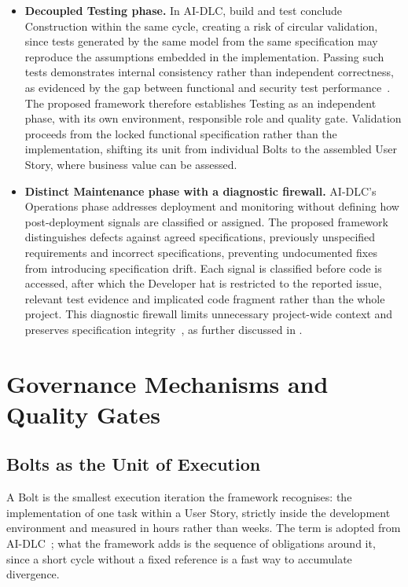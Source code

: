 \begin{itemize}[leftmargin=0.6cm, itemsep=0.5em]

\item \textbf{Decoupled Testing phase.} In \ac{AI-DLC}, build and test conclude Construction within the same cycle, creating a risk of circular validation, since tests generated by the same model from the same specification may reproduce the assumptions embedded in the implementation. Passing such tests demonstrates internal consistency rather than independent correctness, as evidenced by the gap between functional and security test performance~\cite{Zhao:2025vibe, Veracode:2025gen}. The proposed framework therefore establishes Testing as an independent phase, with its own environment, responsible role and quality gate. Validation proceeds from the locked functional specification rather than the implementation, shifting its unit from individual Bolts to the assembled User Story, where business value can be assessed.

\item \textbf{Distinct Maintenance phase with a diagnostic firewall.} \ac{AI-DLC}'s Operations phase addresses deployment and monitoring without defining how post-deployment signals are classified or assigned. The proposed framework distinguishes defects against agreed specifications, previously unspecified requirements and incorrect specifications, preventing undocumented fixes from introducing specification drift. Each signal is classified before code is accessed, after which the Developer hat is restricted to the reported issue, relevant test evidence and implicated code fragment rather than the whole project. This diagnostic firewall limits unnecessary project-wide context and preserves specification integrity~\cite{Zhao:2025vibe}, as further discussed in .

\end{itemize}

\section{Governance Mechanisms and Quality Gates}
\label{sec:governance}


\subsection{Bolts as the Unit of Execution}
\label{sec:bolts}
A Bolt is the smallest execution iteration the framework recognises: the implementation of one task within a User Story, strictly inside the development environment and measured in hours rather than weeks. The term is adopted from \ac{AI-DLC}~\cite{AWS:2025aidlc}; what the framework adds is the sequence of obligations around it, since a short cycle without a fixed reference is a fast way to accumulate divergence.

